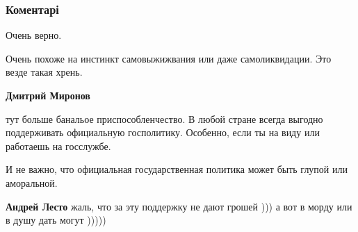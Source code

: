  
 
 
 
 
\subsubsection{Коментарі}

\begin{itemize}
 
Очень верно.

 
Очень похоже на инстинкт самовыжижвания или даже самоликвидации. Это везде такая хрень.

\begin{itemize}
 
\textbf{Дмитрий Миронов} 

тут больше банальое приспособленчество. В любой стране всегда выгодно
поддерживать официальную госполитику. Особенно, если ты на виду или работаешь
на госслужбе.

И не важно, что официальная государственная политика может быть глупой или
аморальной.


 
\textbf{Андрей Лесто} жаль, что за эту поддержку не дают грошей ))) а вот в морду или в душу дать могут )))))


\end{itemize}
\end{itemize}
